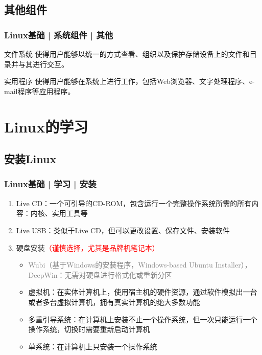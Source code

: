 \subsection{其他组件}
\begin{frame}
  \frametitle{Linux基础 | 系统组件 | 其他}
  \begin{block}{文件系统}
    使得用户能够以统一的方式查看、组织以及保护存储设备上的文件和目录并与其进行交互。
  \end{block}
  \pause
  \begin{block}{实用程序}
    使得用户能够在系统上进行工作，包括Web浏览器、文字处理程序、e-mail程序等应用程序。
  \end{block}
\end{frame}

\section{Linux的学习}
\subsection{安装Linux}
\begin{frame}
  \frametitle{Linux基础 | 学习 | 安装}
  \begin{enumerate}[<+->]
    \item Live CD：一个可引导的CD-ROM，包含运行一个完整操作系统所需的所有内容：内核、实用工具等
    \item Live USB：类似于Live CD，但可以更改设置、保存文件、安装软件
    \item 硬盘安装\textcolor{red}{（谨慎选择，尤其是品牌机笔记本）}
      \begin{itemize}
        \item \textcolor{gray}{Wubi（基于Windows的安装程序，Windows-based Ubuntu Installer），DeepWin：无需对硬盘进行格式化或重新分区}
        \item 虚拟机：在实体计算机上，使用宿主机的硬件资源，通过软件模拟出一台或者多台虚拟计算机，拥有真实计算机的绝大多数功能
        \item 多重引导系统：在计算机上安装不止一个操作系统，但一次只能运行一个操作系统，切换时需要重新启动计算机
        \item 单系统：在计算机上只安装一个操作系统
      \end{itemize}
  \end{enumerate}
\end{frame}

